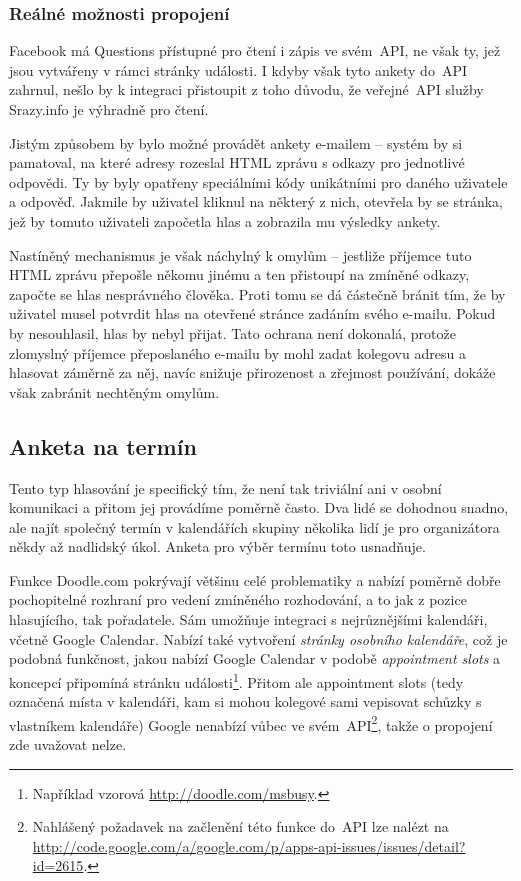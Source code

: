 \documentclass[12pt,oneside,final]{fithesis2}
\begin{document}
\subsubsection*{Reálné možnosti propojení}
Facebook má Questions přístupné pro čtení i zápis ve svém~API, ne však ty, jež jsou vytvářeny v rámci stránky události. I kdyby však tyto ankety do~API zahrnul, nešlo by k integraci přistoupit z toho důvodu, že veřejné~API služby Srazy.info je výhradně pro čtení.

Jistým způsobem by bylo možné provádět ankety e-mailem -- systém by si pamatoval, na které adresy rozeslal HTML zprávu s odkazy pro jednotlivé odpovědi. Ty by byly opatřeny speciálními kódy unikátními pro daného uživatele a odpověď. Jakmile by uživatel kliknul na některý z nich, otevřela by se stránka, jež by tomuto uživateli započetla hlas a zobrazila mu výsledky ankety.

Nastíněný mechanismus je však náchylný k omylům -- jestliže příjemce tuto HTML zprávu přepošle někomu jinému a ten přistoupí na zmíněné odkazy, započte se hlas nesprávného člověka. Proti tomu se dá částečně bránit tím, že by uživatel musel potvrdit hlas na otevřené stránce zadáním svého e-mailu. Pokud by nesouhlasil, hlas by nebyl přijat. Tato ochrana není dokonalá, protože zlomyslný příjemce přeposlaného e-mailu by mohl zadat kolegovu adresu a hlasovat záměrně za něj, navíc snižuje přirozenost a zřejmost používání, dokáže však zabránit nechtěným omylům.

\subsection{Anketa na termín}\label{datePoll}
Tento typ hlasování je specifický tím, že není tak triviální ani v osobní komunikaci a přitom jej provádíme poměrně často. Dva lidé se dohodnou snadno, ale najít společný termín v kalendářích skupiny několika lidí je pro organizátora někdy až nadlidský úkol. Anketa pro výběr termínu toto usnadňuje.

Funkce Doodle.com pokrývají většinu celé problematiky a nabízí poměrně dobře pochopitelné rozhraní pro vedení zmíněného rozhodování, a to jak z pozice hlasujícího, tak pořadatele. Sám umožňuje integraci s nejrůznějšími kalendáři, včetně Google Calendar. Nabízí také vytvoření \emph{stránky osobního kalendáře}, což je podobná funkčnost, jakou nabízí Google Calendar v podobě \emph{appointment slots} a koncepcí připomíná stránku události\footnote{Například vzorová \url{http://doodle.com/msbusy}.}. Přitom ale appointment slots (tedy označená místa v kalendáři, kam si mohou kolegové sami vepisovat schůzky s vlastníkem kalendáře) Google nenabízí vůbec ve svém~API\footnote{Nahlášený požadavek na začlenění této funkce do~API lze nalézt na \url{http://code.google.com/a/google.com/p/apps-api-issues/issues/detail?id=2615}.}, takže o propojení zde uvažovat nelze.
\end{document}

